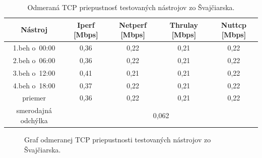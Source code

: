     \begin{table}[h!]
        \begin{center}
            \begin{tabular}{|c|c|c|c|c|}
                \hline
            Nástroj & Iperf [Mbps]& Netperf [Mbps]& Thrulay [Mbps]& Nuttcp [Mbps]\\ 
                \hline
                1.beh o~00:00 & 0,36 & 0,22 & 0,21 & 0,22 \\
                \hline
                2.beh o~06:00 & 0,36 & 0,22 & 0,21 & 0,22 \\
                \hline
                3.beh o~12:00 & 0,41 & 0,21 & 0,21 & 0,22 \\
                \hline
                4.beh o~18:00 & 0,37 & 0,22 & 0,21 & 0,22 \\
                \hline
                priemer       & 0,36 & 0,22 & 0,21 & 0,22 \\
                \hline
                smerodajná odchýlka & \multicolumn{4}{c|}{0,062}\\
                \hline
            \end{tabular}
            \caption{Odmeraná TCP priepustnosť testovaných nástrojov zo
                Švajčiarska.} 
            \label{tab_test_tcp_swiss}
        \end{center}
    \end{table}
   \begin{figure}[H]
       \begin{center}
               \caption{Graf odmeranej TCP priepustnosti testovaných nástrojov
               zo Švajčiarska.}
           \label{tab_test_tcp_swiss_graf}
       \end{center}
   \end{figure}

